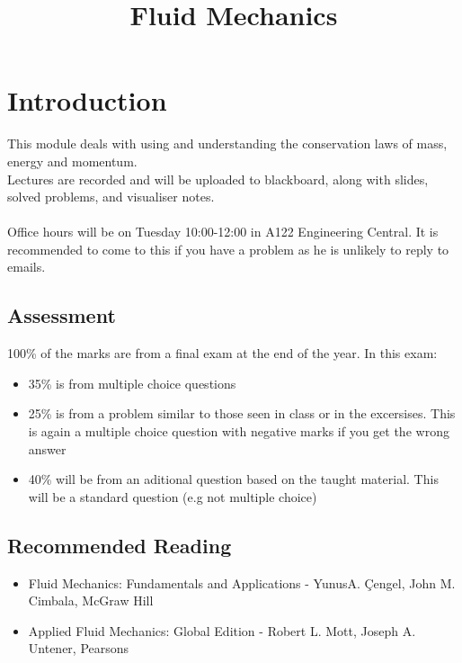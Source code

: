 \documentclass[12pt,a4paper]{article}
\begin{document}
\title{Fluid Mechanics}
\date{}
\maketitle

\newpage

\tableofcontents

\newpage

\section{Introduction}
    This module deals with using and understanding the conservation laws of mass, energy and momentum. \\
    Lectures are recorded and will be uploaded to blackboard, along with slides, solved problems, and visualiser notes. \\
    \\
    Office hours will be on Tuesday 10:00-12:00 in A122 Engineering Central. It is recommended to come to this if you have a problem as he is unlikely to reply to emails. 

    \subsection{Assessment}
        100\% of the marks are from a final exam at the end of the year. In this exam:
        \begin{itemize}
            \item 35\% is from multiple choice questions
            \item 25\% is from a problem similar to those seen in class or in the excersises. This is again a multiple choice question with negative marks if you get the wrong answer
            \item 40\% will be from an aditional question based on the taught material. This will be a standard question (e.g not multiple choice)
        \end{itemize}

    \subsection{Recommended Reading}
        \begin{itemize}
            \item Fluid Mechanics: Fundamentals and Applications - YunusA. Çengel, John M. Cimbala, McGraw Hill
            \item Applied Fluid Mechanics: Global Edition - Robert L. Mott, Joseph A. Untener, Pearsons
        \end{itemize}
\end{document}
